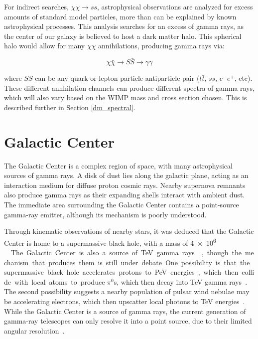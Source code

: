     For indirect searches, $\chi\chi \rightarrow ss$, astrophysical observations are analyzed for excess amounts of standard model particles, more than can be explained by known astrophysical processes.
    This analysis searches for an excess of gamma rays, as the center of our galaxy is believed to host a dark matter halo.
    This spherical halo would allow for many $\chi\chi$ annihilations, producing gamma rays via: 
    
    $$\chi\bar{\chi} \rightarrow S\bar{S} \rightarrow \gamma\gamma$$

    where $S\bar{S}$ can be any quark or lepton particle-antiparticle pair ($t\bar{t}$, $s\bar{s}$, $e^{-}e^{+}$, etc).
    These different annhilation channels can produce different spectra of gamma rays, which will also vary based on the WIMP mass and cross section chosen.
    This is described further in Section \ref{dm_spectral}.

\FloatBarrier

\section{Galactic Center}

  The Galactic Center is a complex region of space, with many astrophysical sources of gamma rays.
  A disk of dust lies along the galactic plane, acting as an interaction medium for diffuse proton cosmic rays.
  Nearby supernova remnants also produce gamma rays as their expanding shells interact with ambient dust.
  The immediate area surrounding the Galactic Center contains a point-source gamma-ray emitter, although its mechanism is poorly understood.

  Through kinematic observations of nearby stars, it was deduced that the Galactic Center is home to a supermassive black hole, with a mass of \SI{4e6}{ \Msol{} }~\cite{sgra_massdist}.
  The Galactic Center is also a source of TeV gamma rays~\cite{gc_pointsrc_hess,gc_pointsource_hess2,gc_veritas_pointsource,gc_magic_pointsource}, though the mechanism that produces them is still under debate.
  One possibility is that the supermassive black hole accelerates protons to PeV energies, which then collide with local atoms to produce $\pi^0$s, which then decay into TeV gamma rays~\cite{gc_pevatron}.
  The second possibility suggests a nearby population of pulsar wind nebulae may be accelerating electrons, which then upscatter local photons to TeV energies~\cite{gc_pulsars}.
  While the Galactic Center is a source of gamma rays, the current generation of gamma-ray telescopes can only resolve it into a point source, due to their limited angular resolution~\cite{VeritasGCRidge2015,gc_pointsrc_hess}.

